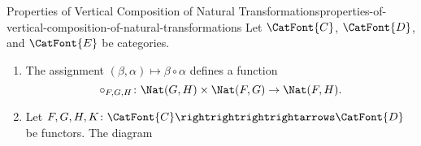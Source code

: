 \begin{proposition}{Properties of Vertical Composition of Natural Transformations}{properties-of-vertical-composition-of-natural-transformations}%
    Let $\CatFont{C}$, $\CatFont{D}$, and $\CatFont{E}$ be categories.
    \begin{enumerate}
        \item\label{properties-of-vertical-composition-of-natural-transformations-functionality}The assignment $(\beta,\alpha)\mapsto\beta\circ\alpha$ defines a function
            \[
                \circ_{F,G,H}%
                \colon%
                \Nat(G,H)%
                \times
                \Nat(F,G)%
                \to%
                \Nat(F,H).%
            \]%
        \item\label{properties-of-vertical-composition-of-natural-transformations-associativity}Let $F,G,H,K\colon\CatFont{C}\rightrightrightrightarrows\CatFont{D}$ be functors. The diagram
            \begin{webcompile}
\end{webcompile}
\end{enumerate}
\end{proposition}
